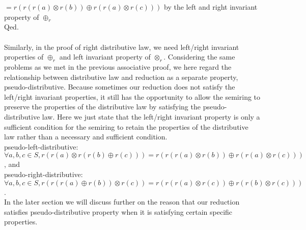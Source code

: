 \documentclass[a4paper,10pt]{article}
\begin{document}
$= r(r(r(a) \otimes r(b)) \oplus r(r(a) \otimes r(c))) $ by the left and right invariant property of $\oplus_r$\\
Qed.\\\\
Similarly, in the proof of right distributive law, we need left/right invariant properties of $\oplus_r$ and left invariant property of $\otimes_r$.
Considering the same problems as we met in the previous associative proof, we here regard the relationship between distributive law and reduction as a separate property, pseudo-distributive.
Because sometimes our reduction does not satisfy the left/right invariant properties, it still has the opportunity to allow the semiring to preserve the properties of the distributive law by satisfying the pseudo-distributive law. Here we just state that the left/right invariant property is only a sufficient condition for the semiring to retain the properties of the distributive law rather than a necessary and sufficient condition. \\
pseudo-left-distributive: $\forall a,b,c \in S, r(r(a) \otimes r(r(b)\oplus r(c))) = r(r(r(a) \otimes r(b)) \oplus r(r(a) \otimes r(c)))$, and \\
pseudo-right-distributive: $\forall a,b,c \in S, r(r(r(a) \oplus r(b)) \otimes r(c)) = r(r(r(a) \otimes r(c)) \oplus r(r(b) \otimes r(c)))$. \\
In the later section we will discuss further on the reason that our reduction satisfies pseudo-distributive property when it is satisfying certain specific properties.
\end{document}

